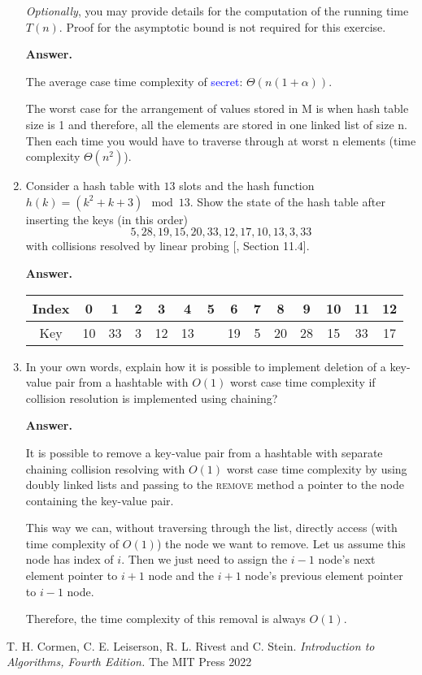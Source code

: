 \documentclass{article}
\begin{document}
\begin{enumerate}
    \textit{Optionally}, you may provide details for the computation of the running time $T(n)$. Proof for the asymptotic bound is not required for this exercise.

    \textbf{Answer.}

    The average case time complexity of \textcolor{blue}{secret}: $\Theta(n(1 + \alpha))$.

    The worst case for the arrangement of values stored in M is when hash table size is 1 and therefore, all the elements are stored in one linked list of size n. Then each time you would have to traverse through at worst n elements (time complexity $\Theta(n^2)$).

    \item Consider a hash table with $13$ slots and the hash function $h(k) = (k^2 + k + 3) \mod 13$. Show the state of the hash table after inserting the keys (in this order)
    \[5, 28, 19, 15, 20, 33, 12, 17, 10, 13, 3, 33\]
    with collisions resolved by linear probing [, Section 11.4].

    \textbf{Answer.}
    
    \begin{center}
    \begin{tabular}{|c|c|c|c|c|c|c|c|c|c|c|c|c|c|}
        \hline
        Index & 0 & 1 & 2 & 3 & 4 & 5 & 6 & 7 & 8 & 9 & 10 & 11 & 12 \\
        \hline
        Key & 10 & 33 & 3 & 12 & 13 &  & 19 & 5 & 20 & 28 & 15 & 33 & 17 \\
        \hline
    \end{tabular}
    \end{center}

    \item In your own words, explain how it is possible to implement deletion of a key-value pair from a hashtable with $O(1)$ worst case time complexity if collision resolution is implemented using chaining?

    \textbf{Answer.} 

    It is possible to remove a key-value pair from a hashtable with separate chaining collision resolving with $O(1)$ worst case time complexity by using doubly linked lists and passing to the \textsc{remove} method a pointer to the node containing the key-value pair.

    This way we can, without traversing through the list, directly access (with time complexity of $O(1)$) the node we want to remove. Let us assume this node has index of $i$. Then we just need to assign the $i - 1$ node's next element pointer to $i + 1$ node and the $i + 1$ node's previous element pointer to $i - 1$ node.

    Therefore, the time complexity of this removal is always $O(1)$.
    
\end{enumerate}

\begin{thebibliography}{9}
  T. H. Cormen, C. E. Leiserson, R. L. Rivest and C. Stein.
  \textit{Introduction to Algorithms, Fourth Edition.}
  The MIT Press
  2022
\end{thebibliography}
\end{document}
